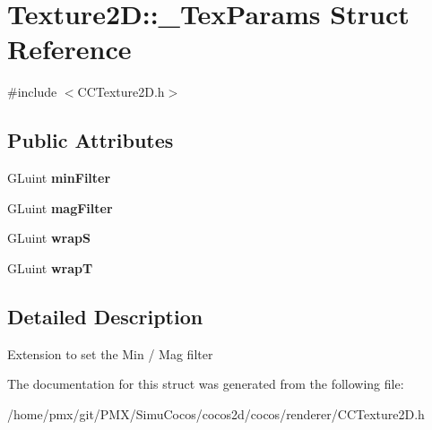 \hypertarget{structTexture2D_1_1__TexParams}{}\section{Texture2D\+:\+:\+\_\+\+Tex\+Params Struct Reference}
\label{structTexture2D_1_1__TexParams}


{\ttfamily \#include $<$C\+C\+Texture2\+D.\+h$>$}

\subsection*{Public Attributes}
\begin{DoxyCompactItemize}
\item 
\mbox{\label{structTexture2D_1_1__TexParams_a924cb7994f3fc3e0e64c9943068a2bae}} 
G\+Luint {\bfseries min\+Filter}
\item 
\mbox{\label{structTexture2D_1_1__TexParams_a454c0682f95f1cbf623ce23a247ea89a}} 
G\+Luint {\bfseries mag\+Filter}
\item 
\mbox{\label{structTexture2D_1_1__TexParams_a1fa2ecfba78c6de463f840747b2a10f7}} 
G\+Luint {\bfseries wrapS}
\item 
\mbox{\label{structTexture2D_1_1__TexParams_ab2dc3f28173584db3da8a92e8c99a390}} 
G\+Luint {\bfseries wrapT}
\end{DoxyCompactItemize}


\subsection{Detailed Description}
Extension to set the Min / Mag filter 

The documentation for this struct was generated from the following file\+:\begin{DoxyCompactItemize}
\item 
/home/pmx/git/\+P\+M\+X/\+Simu\+Cocos/cocos2d/cocos/renderer/C\+C\+Texture2\+D.\+h\end{DoxyCompactItemize}
